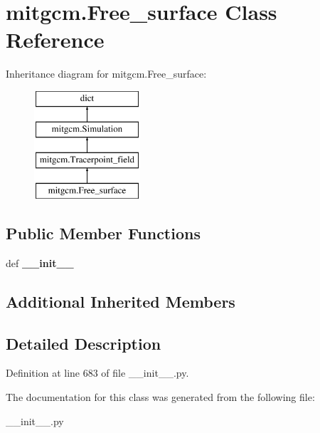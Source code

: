 \hypertarget{classmitgcm_1_1Free__surface}{\section{mitgcm.\+Free\+\_\+surface Class Reference}
\label{classmitgcm_1_1Free__surface}
}
Inheritance diagram for mitgcm.\+Free\+\_\+surface\+:\begin{figure}[H]
\begin{center}
\leavevmode
\includegraphics[height=4.000000cm]{classmitgcm_1_1Free__surface}
\end{center}
\end{figure}
\subsection*{Public Member Functions}
\begin{DoxyCompactItemize}
\item 
\hypertarget{classmitgcm_1_1Free__surface_a92630a9966a8f863bfa7d58aa844ad41}{def {\bfseries \+\_\+\+\_\+init\+\_\+\+\_\+}}\label{classmitgcm_1_1Free__surface_a92630a9966a8f863bfa7d58aa844ad41}

\end{DoxyCompactItemize}
\subsection*{Additional Inherited Members}


\subsection{Detailed Description}


Definition at line 683 of file \+\_\+\+\_\+init\+\_\+\+\_\+.\+py.



The documentation for this class was generated from the following file\+:\begin{DoxyCompactItemize}
\item 
\+\_\+\+\_\+init\+\_\+\+\_\+.\+py\end{DoxyCompactItemize}
